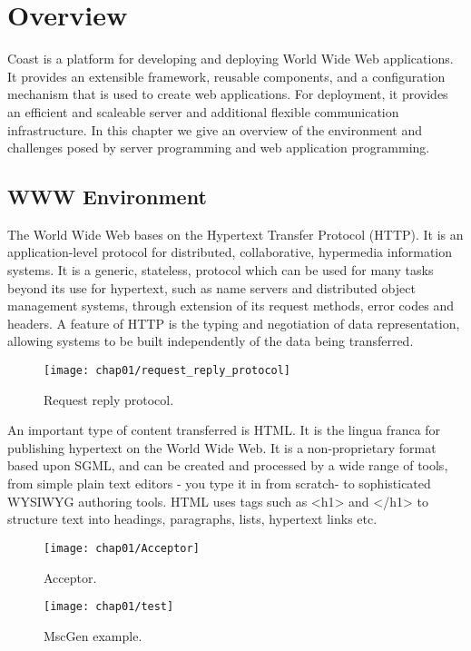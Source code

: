 \clearpage{}
\chapter{Overview}\label{Overview}
Coast is a platform for developing and deploying World Wide Web
applications. It provides an extensible framework, reusable
components, and a configuration mechanism that is used to create web
applications. For deployment, it provides an efficient and scaleable
server and additional flexible communication infrastructure.
In this chapter we give an overview of the environment and challenges
posed by server programming and web application programming.

\section{WWW Environment}
The World Wide Web bases on the Hypertext Transfer Protocol (HTTP). It
is an application-level protocol for distributed, collaborative,
hypermedia information systems. It is a generic, stateless, protocol
which can be used for many tasks beyond its use for hypertext, such as
name servers and distributed object management systems, through
extension of its request methods, error codes and headers. A feature
of HTTP is the typing and negotiation of data representation, allowing
systems to be built independently of the data being transferred. 

\begin{figure}[hbt]
  \centering
  \texttt{[image: chap01/request\_reply\_protocol]}
  \caption{Request reply protocol.}
  \label{fig:request_reply_protocol}
\end{figure}

An important type of content transferred is HTML. It is the lingua
franca for publishing hypertext on the World Wide Web. It is a
non-proprietary format based upon SGML, and can be created and
processed by a wide range of tools, from simple plain text editors -
you type it in from scratch- to sophisticated WYSIWYG authoring tools.
HTML uses tags such as <h1> and </h1> to structure text into headings,
paragraphs, lists, hypertext links etc. 

\begin{figure}[hbt]
  \centering
  \texttt{[image: chap01/Acceptor]}
  \caption{Acceptor.}
  \label{fig:zipstream}
\end{figure}

\begin{figure}[hbt]
  \centering
  \texttt{[image: chap01/test]}
  \caption{MscGen example.}
  \label{fig:request_reply_protocol}
\end{figure}

